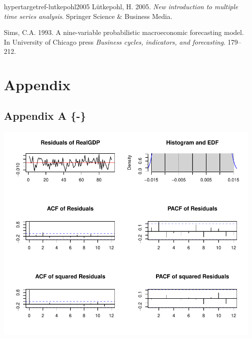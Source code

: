 \documentclass[11pt,preprint, authoryear]{elsarticle}
\let\origfigure\figure
\let\endorigfigure\endfigure
\renewenvironment{figure}[1][2] {
    \expandafter\origfigure\expandafter[H]
} {
    \endorigfigure
}
\numberwithin{equation}{section}
\numberwithin{figure}{section}
\numberwithin{table}{section}
\newlength{\cslhangindent}
\newenvironment{CSLReferences}%
  {\setlength{\parindent}{0pt}%
  \everypar{\setlength{\hangindent}{\cslhangindent}}\ignorespaces}%
  {\par}
\begin{document}
\begin{CSLReferences}{1}{0}
hypertarget{ref-lutkepohl2005}{}}%
Lütkepohl, H. 2005. \emph{New introduction to multiple time series
analysis}. Springer Science \& Business Media.

\leavevmode{}%
Sims, C.A. 1993. A nine-variable probabilistic macroeconomic forecasting
model. In University of Chicago press \emph{Business cycles, indicators,
and forecasting}. 179--212.

\end{CSLReferences}

\newpage

\hypertarget{appendix}{%
\section*{Appendix}\label{appendix}}

\appendix
\renewcommand{\thesection}{A}

\hypertarget{appendix-a--}{%
\subsection{\texorpdfstring{Appendix A \{-\}
\label{A}}{Appendix A \{-\} }}\label{appendix-a--}}

\begin{figure}
\centering
\includegraphics{Time_Series_Proj_Data_files/figure-latex/unnamed-chunk-5-1.pdf}
\caption{Diagnostics plot of VAR(2) for Real GDP\label{figA1}}
\end{figure}
\end{document}
